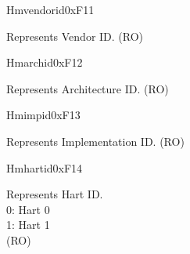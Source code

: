 \begin{register}{H}{mvendorid}{0xF11}\label{regdesc:MVENDORID}
%
\regnewline%
\begin{regdesc}\begin{reglist}
\label{fielddesc:MVENDORID}\item [MVENDORID] Represents Vendor ID. (RO)
\end{reglist}\end{regdesc}
\end{register}

\begin{register}{H}{marchid}{0xF12}\label{regdesc:MARCHID}
%
\regnewline%
\begin{regdesc}\begin{reglist}
\label{fielddesc:MARCHID}\item [MARCHID] Represents Architecture ID. (RO)
\end{reglist}\end{regdesc}
\end{register}

\begin{register}{H}{mimpid}{0xF13}\label{regdesc:MIMPID}
%
\regnewline%
\begin{regdesc}\begin{reglist}
\label{fielddesc:MIMPID}\item [MIMPID] Represents Implementation ID. (RO)
\end{reglist}\end{regdesc}
\end{register}

\begin{register}{H}{mhartid}{0xF14}\label{regdesc:MHARTID}
%
\regnewline%
\begin{regdesc}\begin{reglist}
\label{fielddesc:MHARTID}\item [MHARTID] Represents Hart ID. \\
0: Hart 0 \\
1: Hart 1 \\
(RO)
\end{reglist}\end{regdesc}
\end{register}

